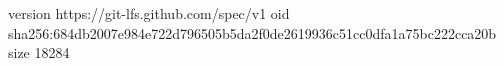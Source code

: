 version https://git-lfs.github.com/spec/v1
oid sha256:684db2007e984e722d796505b5da2f0de2619936c51cc0dfa1a75bc222cca20b
size 18284
